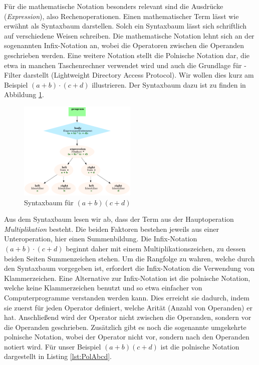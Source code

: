 Für die mathematische Notation besonders relevant sind die Ausdrücke (\emph{Expression}), also Rechenoperationen. Einen mathematischer Term lässt wie erwähnt als Syntaxbaum darstellen. Solch ein Syntaxbaum lässt sich schriftlich auf verschiedene Weisen schreiben. Die mathematische Notation lehnt sich an der sogenannten Infix-Notation an, wobei die Operatoren zwischen die Operanden geschrieben werden. Eine weitere Notation stellt die Polnische Notation dar, die etwa in manchen Taschenrechner verwendet wird und auch die Grundlage für -Filter darstellt (Lightweight Directory Access Protocol). Wir wollen dies kurz am Beispiel $(a+b)\cdot(c+d)$ illustrieren. Der Syntaxbaum dazu ist zu finden in Abbildung \ref{fig:JsAbcdBaum}.

\begin{figure}
	\centering
	\includegraphics[width=0.5\textwidth]{./img/js-tree-abcd.png}
	\caption{Syntaxbaum für $(a+b)(c+d)$}
	\label{fig:JsAbcdBaum}
\end{figure}

Aus dem Syntaxbaum lesen wir ab, dass der Term aus der Hauptoperation \emph{Multiplikation} besteht. Die beiden Faktoren bestehen jeweils aus einer Unteroperation, hier einen Summenbildung. Die Infix-Notation $(a+b)\cdot(c+d)$ beginnt daher mit einem Multiplikationszeichen, zu dessen beiden Seiten Summenzeichen stehen. Um die Rangfolge zu wahren, welche durch den Syntaxbaum vorgegeben ist, erfordert die Infix-Notation die Verwendung von Klammerzeichen. Eine Alternative zur Infix-Notation ist die polnische Notation, welche keine Klammerzeichen benutzt und so etwa einfacher von Computerprogramme verstanden werden kann. Dies erreicht sie dadurch, indem sie zuerst für jeden Operator definiert, welche Arität (Anzahl von Operanden) er hat. Anschließend wird der Operator nicht zwischen die Operanden, sondern vor die Operanden geschrieben. Zusätzlich gibt es noch die sogenannte umgekehrte polnische Notation, wobei der Operator nicht vor, sondern nach den Operanden notiert wird. Für unser Beispiel $(a+b)(c+d)$ ist die polnische Notation dargestellt in Listing \ref{lst:PolAbcd}.

